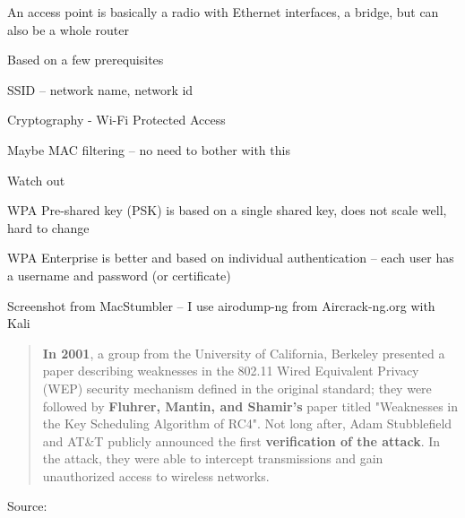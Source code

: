 \documentclass[Screen16to9,17pt]{foils}
\begin{document}


An access point is basically a radio with Ethernet interfaces, a bridge, but can also be a whole router


\begin{list1}
\item Based on a few prerequisites
  \begin{list2}
  \item SSID -- network name, network id
  \item Cryptography - Wi-Fi Protected Access
  \item Maybe MAC filtering -- no need to bother with this
  \end{list2}
\item Watch out
  \begin{list2}
  \item WPA Pre-shared key (PSK) is based on a single shared key, does not scale well, hard to change
\item WPA Enterprise is better and based on individual authentication -- each user has a username and password (or certificate)
  \end{list2}

\end{list1}




Screenshot from MacStumbler -- I use airodump-ng from Aircrack-ng.org with Kali




\begin{quote}
{\bf In 2001}, a group from the University of California, Berkeley presented a paper describing weaknesses in the 802.11 Wired Equivalent Privacy (WEP) security mechanism defined in the original standard; they were followed by {\bf Fluhrer, Mantin, and Shamir's} paper titled "Weaknesses in the Key Scheduling Algorithm of RC4". Not long after, Adam Stubblefield and AT\&T publicly announced the first {\bf verification of the attack}. In the attack, they were able to intercept transmissions and gain unauthorized access to wireless networks.
\end{quote}
Source: 
\end{document}
